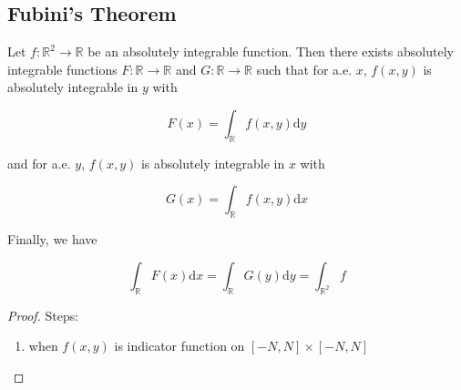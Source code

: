 \subsection{Fubini's Theorem}

\begin{thm}
    Let $f: \mathbb{R}^2 \to \mathbb{R}$ be an absolutely integrable function.
    Then there exists absolutely integrable functions $F: \mathbb{R} \to \mathbb{R}$
    and $G: \mathbb{R} \to \mathbb{R}$ such that for a.e. $x$, $f(x,y)$ is absolutely
    integrable in $y$ with

    \[
        F(x) = \int_{\mathbb{R}} f(x,y) \mathrm{d}y
    \]

    and for a.e. $y$, $f(x,y)$ is absolutely integrable in $x$ with


    \[
        G(x) = \int_{\mathbb{R}} f(x,y) \mathrm{d}x
    \]

    Finally, we have

    \[
        \int_{\mathbb{R}} F(x) \mathrm{d}x =\int_{\mathbb{R}} G(y) \mathrm{d}y = \int_{\mathbb{R}^2} f
    \]
\end{thm}

\begin{proof}
    Steps:

    \begin{enumerate}
        \item when $f(x,y)$ is indicator function on $[-N, N] \times [-N, N]$


    \end{enumerate}
\end{proof}